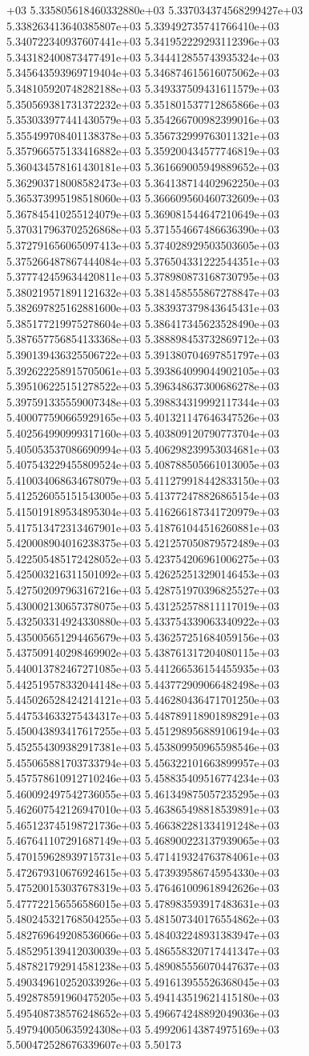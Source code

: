 +03	5.335805618460332880e+03	5.337034374568299427e+03	5.338263413640385807e+03	5.339492735741766410e+03	5.340722340937607441e+03	5.341952229293112396e+03	5.343182400873477491e+03	5.344412855743935324e+03	5.345643593969719404e+03	5.346874615616075062e+03	5.348105920748282188e+03	5.349337509431611579e+03	5.350569381731372232e+03	5.351801537712865866e+03	5.353033977441430579e+03	5.354266700982399016e+03	5.355499708401138378e+03	5.356732999763011321e+03	5.357966575133416882e+03	5.359200434577746819e+03	5.360434578161430181e+03	5.361669005949889652e+03	5.362903718008582473e+03	5.364138714402962250e+03	5.365373995198518060e+03	5.366609560460732609e+03	5.367845410255124079e+03	5.369081544647210649e+03	5.370317963702526868e+03	5.371554667486636390e+03	5.372791656065097413e+03	5.374028929503503605e+03	5.375266487867444084e+03	5.376504331222544351e+03	5.377742459634420811e+03	5.378980873168730795e+03	5.380219571891121632e+03	5.381458555867278847e+03	5.382697825162881600e+03	5.383937379843645431e+03	5.385177219975278604e+03	5.386417345623528490e+03	5.387657756854133368e+03	5.388898453732869712e+03	5.390139436325506722e+03	5.391380704697851797e+03	5.392622258915705061e+03	5.393864099044902105e+03	5.395106225151278522e+03	5.396348637300686278e+03	5.397591335559007348e+03	5.398834319992117344e+03	5.400077590665929165e+03	5.401321147646347526e+03	5.402564990999317160e+03	5.403809120790773704e+03	5.405053537086690994e+03	5.406298239953034681e+03	5.407543229455809524e+03	5.408788505661013005e+03	5.410034068634678079e+03	5.411279918442833150e+03	5.412526055151543005e+03	5.413772478826865154e+03	5.415019189534895304e+03	5.416266187341720979e+03	5.417513472313467901e+03	5.418761044516260881e+03	5.420008904016238375e+03	5.421257050879572489e+03	5.422505485172428052e+03	5.423754206961006275e+03	5.425003216311501092e+03	5.426252513290146453e+03	5.427502097963167216e+03	5.428751970396825527e+03	5.430002130657378075e+03	5.431252578811117019e+03	5.432503314924330880e+03	5.433754339063340922e+03	5.435005651294465679e+03	5.436257251684059156e+03	5.437509140298469902e+03	5.438761317204080115e+03	5.440013782467271085e+03	5.441266536154455935e+03	5.442519578332044148e+03	5.443772909066482498e+03	5.445026528424214121e+03	5.446280436471701250e+03	5.447534633275434317e+03	5.448789118901898291e+03	5.450043893417617255e+03	5.451298956889106194e+03	5.452554309382917381e+03	5.453809950965598546e+03	5.455065881703733794e+03	5.456322101663899957e+03	5.457578610912710246e+03	5.458835409516774234e+03	5.460092497542736055e+03	5.461349875057235295e+03	5.462607542126947010e+03	5.463865498818539891e+03	5.465123745198721736e+03	5.466382281334191248e+03	5.467641107291687149e+03	5.468900223137939065e+03	5.470159628939715731e+03	5.471419324763784061e+03	5.472679310676924615e+03	5.473939586745954330e+03	5.475200153037678319e+03	5.476461009618942626e+03	5.477722156556586015e+03	5.478983593917483631e+03	5.480245321768504255e+03	5.481507340176554862e+03	5.482769649208536066e+03	5.484032248931383947e+03	5.485295139412030039e+03	5.486558320717441347e+03	5.487821792914581238e+03	5.489085556070447637e+03	5.490349610252033926e+03	5.491613955526368045e+03	5.492878591960475205e+03	5.494143519621415180e+03	5.495408738576248652e+03	5.496674248892049036e+03	5.497940050635924308e+03	5.499206143874975169e+03	5.500472528676339607e+03	5.50173